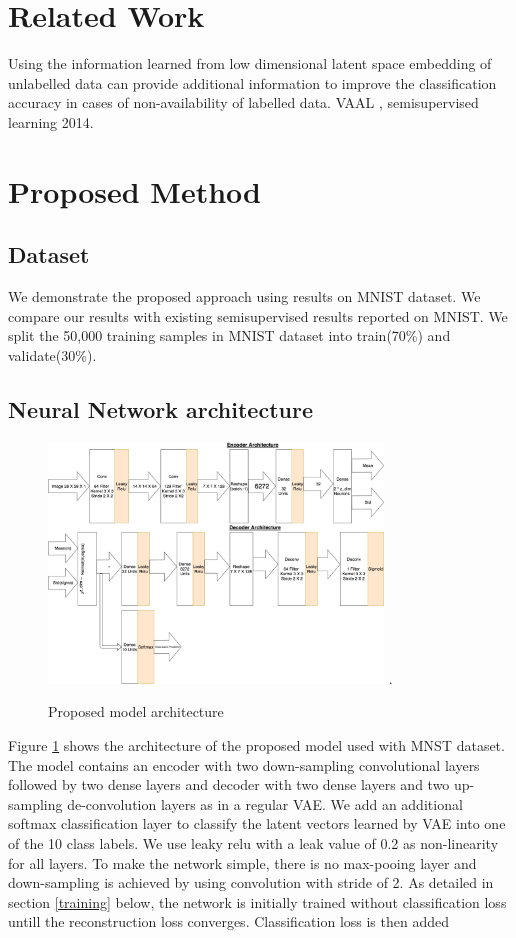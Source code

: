 \documentclass[runningheads]{llncs}
\begin{document}
\section{Related Work}
Using the information learned from low dimensional latent space embedding of unlabelled data can provide additional information to improve the classification accuracy in cases of non-availability of labelled data.
VAAL , semisupervised learning 2014.

\section{Proposed Method}

\subsection{Dataset}
We demonstrate the proposed approach using results on MNIST dataset.
We compare our results with existing semisupervised results reported on MNIST.
We split the 50,000 training samples in MNIST dataset into train(70\%) and validate(30\%).

\subsection{Neural Network architecture}

\begin{figure}[!t]
\centering
\includegraphics[width=3.5in]{vae_model_architecture_classification.jpg}
\DeclareGraphicsExtensions.
\caption{Proposed model architecture}
\label{vae_architecture}
\end{figure}

Figure \ref{vae_architecture} shows the architecture of the proposed model used with MNST dataset.
The model contains an encoder  with two down-sampling convolutional layers followed by two dense layers and decoder with two dense layers and two up-sampling de-convolution layers as in a regular VAE.
We add an additional softmax classification layer to classify the latent vectors learned by VAE into one of the 10 class labels.
We use leaky relu with a leak value of 0.2 as non-linearity for all layers. To make the network simple, there is no max-pooing layer and down-sampling is achieved by using convolution with stride of 2.
As detailed in section \ref{training} below, the network is initially trained without classification loss untill the reconstruction loss converges.
Classification loss is then added
\end{document}

